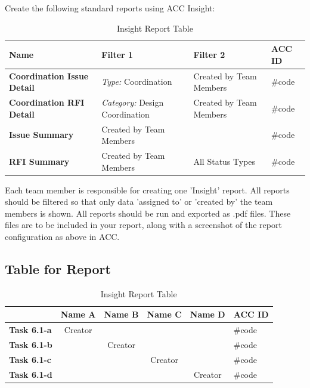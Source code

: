 Create the following standard reports using ACC Insight: 

\begin{table}[ht]
	\centering
	\begin{tabular}{|p{}|p{}|p{}|p{}|}
		\hline
		\textbf{Name} & \textbf{Filter 1} & \textbf{Filter 2} & \textbf{ACC ID}\\
		\hline
		\textbf{Coordination Issue Detail} & \textit{Type:} Coordination & Created by Team Members & \#code\\
		\hline
		\textbf{Coordination RFI Detail} & \textit{Category:} Design Coordination & Created by Team Members & \#code\\
		\hline
		\textbf{Issue Summary} & Created by Team Members &  & \#code\\
		\hline
		\textbf{RFI Summary} & Created by Team Members & All Status Types & \#code\\
		\hline
	\end{tabular}
	\caption{Insight Report Table }
	\label{tab:insight-items}
\end{table}



Each team member is responsible for creating one 'Insight' report.  All reports should be filtered so that only data 'assigned to' or 'created by' the team members is shown.  All reports should be run and exported as .pdf files.  These files are to be included in your report, along with a screenshot of the report configuration as above in ACC.\\

\subsection{Table for Report}

\begin{table}[ht]
	\centering
	\begin{tabular}{|l|c|c|c|c|l|}
		\hline
		& \textbf{Name A} & \textbf{Name B} & \textbf{Name C} & \textbf{Name D} & \textbf{ACC ID}\\
		\hline
		\textbf{Task 6.1-a} &  Creator &  &  &  & \#code\\
		\textbf{Task 6.1-b} &  & Creator &  &  & \#code\\
		\textbf{Task 6.1-c} &  &  & Creator &  & \#code\\
		\textbf{Task 6.1-d} &  &  &  & Creator & \#code\\
		\hline
	\end{tabular}
	\caption{Insight Report Table }
	\label{tab:report-items}
\end{table}



